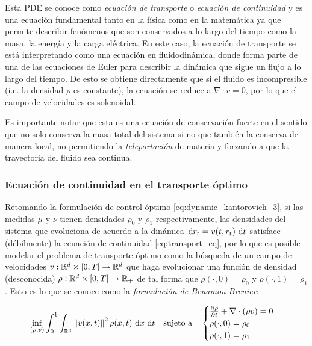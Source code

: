 Esta PDE se conoce como \textit{ecuación de transporte} o \textit{ecuación de continuidad} y es una ecuación fundamental tanto en la física como en la matemática ya que permite describir fenómenos que son conservados a lo largo del tiempo como la masa, la energía y la carga eléctrica. En este caso, la ecuación de transporte se está interpretando como una ecuación en fluidodinámica, donde forma parte de una de las ecuaciones de Euler para describir la dinámica que sigue un flujo a lo largo del tiempo. De esto se obtiene directamente que si el fluido es incompresible (i.e. la densidad $\rho$ es constante), la ecuación se reduce a $\nabla\cdot v = 0$, por lo que el campo de velocidades es solenoidal.

Es importante notar que esta es una ecuación de conservación fuerte en el sentido que no solo conserva la masa total del sistema si no que también la conserva de manera local, no permitiendo la \textit{teleportación} de materia y forzando a que la trayectoria del fluido sea continua.

\subsubsection{Ecuación de continuidad en el transporte óptimo}

Retomando la formulación de control óptimo \eqref{eq:dynamic_kantorovich_3}, si las medidas $\mu$ y $\nu$ tienen densidades $\rho_0$ y $\rho_1$ respectivamente, las densidades del sistema que evoluciona de acuerdo a la dinámica $\,\operatorname{d}\! r_t = v(t,r_t)\,\operatorname{d}\! t$ satisface (débilmente) la ecuación de continuidad \eqref{eq:transport_eq}, por lo que  es posible modelar el problema de transporte óptimo como la búsqueda de un campo de velocidades $v:\mathbb{R}^d\times[0,T]\to\mathbb{R}^d$ que haga evolucionar una función de densidad (desconocida) $\rho:\mathbb{R}^d\times[0,T]\to\mathbb{R}_+$ de tal forma que $\rho(\cdot,0)=\rho_0$ y $\rho(\cdot,1)=\rho_1$. Esto es lo que se conoce como la \textit{formulación de Benamou-Brenier}:

\begin{equation*}
	\inf_{(\rho,v)} \int_0^1 \int_{\mathbb{R}^d} \left\lVert v(x,t) \right\rVert^2 \rho(x,t) \,\operatorname{d}\! x\,\operatorname{d}\! t
	\quad \text{sujeto a} \quad
	\begin{cases}
		\frac{\partial \rho}{\partial t} + \nabla\cdot(\rho v) = 0\\
		\rho(\cdot,0) = \rho_0\\
		\rho(\cdot,1) = \rho_1
	\end{cases}
\end{equation*}

